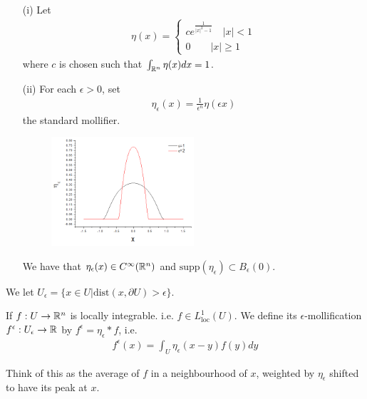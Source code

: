 \documentclass[10pt,a4paper]{report}
\begin{document}
 \begin{itemize}
\item[(i)] Let \begin{align*}
\eta(x) = \begin{cases}
c e^{\frac{1}{|x|^2 -1}} \quad |x|<1 \\
0 \quad \quad |x| \geq 1
\end{cases}
\end{align*}
where $c$ is chosen such that $\int_{\mathbb{R}^n} \eta(x) dx =1$.
\item[(ii)] For each $\epsilon >0$, set
\begin{align*}
\eta_{\epsilon}(x) = \frac{1}{\epsilon^n} \eta(\epsilon x)
\end{align*}
the standard mollifier.
\s

\begin{figure}[h]
	\centering
	\includegraphics[width=0.5\textwidth]{kernel}
\end{figure}
\s

We have that $\eta_{\epsilon}(x) \in C^{\infty}(\mathbb{R}^n)$ and $\text{supp}(\eta_{\epsilon}) \subset B_{\epsilon}(0)$.
\end{itemize} 
\s

We let $U_{\epsilon} = \{ x\in U | \text{dist}(x,\partial U) > \epsilon \}$.
\s

 If $f: U\rightarrow \mathbb{R}^n$ is locally integrable. i.e. $f\in L^1_{\text{loc}}(U)$. We define its $\epsilon$-mollification $f^{\epsilon} : U_{\epsilon} \rightarrow \mathbb{R}$ by $f^{\epsilon} = \eta_\epsilon * f$, i.e.
\begin{align*}
f^{\epsilon}(x) = \int_U \eta_{\epsilon}(x-y) f(y)dy
\end{align*}
\s

Think of this as the average of $f$ in a neighbourhood of $x$, weighted by $\eta_{\epsilon}$ shifted to have its peak at $x$.
\s
\end{document}

